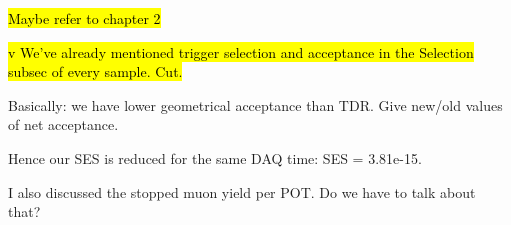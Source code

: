 \hl{Maybe refer to chapter 2}


\hl{ v We've already mentioned trigger selection and acceptance in the Selection
    subsec of every sample. Cut.}
    

Basically: we have lower geometrical acceptance than TDR. Give new/old values of
net acceptance.

Hence our SES is reduced for the same DAQ time: SES = 3.81e-15.

I also discussed the stopped muon yield per POT. Do we have to talk about that?


